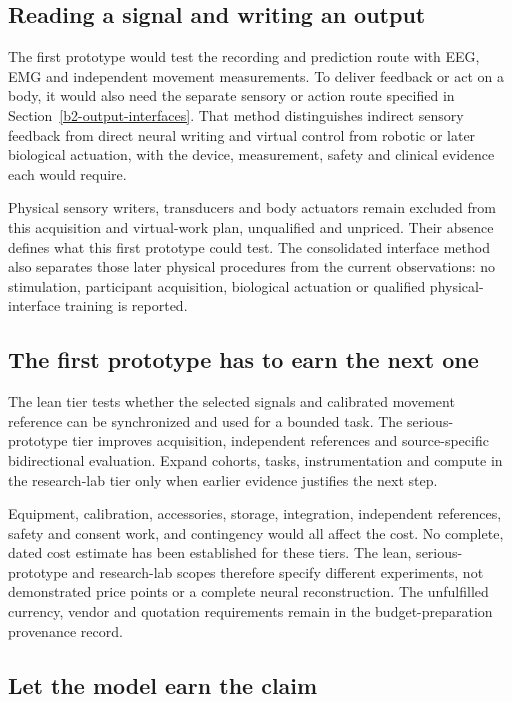 \subsection{Reading a signal and writing an output}

The first prototype would test the recording and prediction route with EEG,
EMG and independent movement measurements. To deliver feedback or act on a
body, it would also need the separate sensory or action route specified in
Section~\ref{b2-output-interfaces}. That method distinguishes indirect sensory
feedback from direct neural writing and virtual control from robotic or later
biological actuation, with the device, measurement, safety and clinical evidence
each would require.

Physical sensory writers, transducers and body actuators remain excluded from
this acquisition and virtual-work plan, unqualified and unpriced. Their absence
defines what this first prototype could test. The consolidated interface method
also separates those later physical procedures from the current observations: no stimulation, participant acquisition, biological actuation or qualified physical-interface training is reported.

\subsection{The first prototype has to earn the next one}

The lean tier tests whether the selected signals and calibrated movement
reference can be synchronized and used for a bounded task. The serious-prototype tier
improves acquisition, independent references and source-specific bidirectional
evaluation. Expand cohorts, tasks, instrumentation and compute in the research-lab
tier only when earlier evidence justifies the next step.

Equipment, calibration, accessories, storage, integration, independent references, safety and consent work, and contingency would all affect the cost. No complete, dated cost estimate has been established for these tiers. The lean, serious-prototype and research-lab scopes therefore specify different experiments, not demonstrated price points or a complete neural reconstruction. The unfulfilled currency, vendor and quotation requirements remain in the budget-preparation provenance record.

\subsection{Let the model earn the claim}

